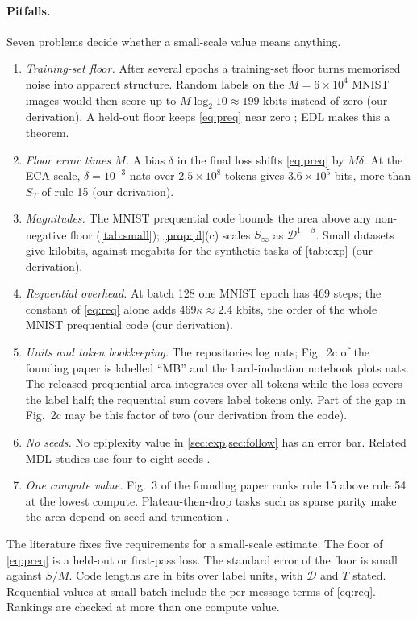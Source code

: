 \documentclass[11pt]{article}
\newcommand{\Dt}{\mathcal{D}}\newcommand{\PT}{\mathcal{P}_T}\newcommand{\prog}{\mathrm{P}}
\theoremstyle{tight}
\begin{document}
\paragraph{Pitfalls.} Seven problems decide whether a small-scale value means anything.
\begin{enumerate}
\item \emph{Training-set floor.} After several epochs a training-set floor turns memorised noise into
apparent structure. Random labels on the $M=6\times10^4$ MNIST images would then score up to
$M\log_2 10\approx199$ kbits instead of zero (our derivation). A held-out floor keeps \eqref{eq:preq}
near zero \citep{zhang2020transfer}; EDL makes this a theorem.
\item \emph{Floor error times $M$.} A bias $\delta$ in the final loss shifts \eqref{eq:preq} by
$M\delta$. At the ECA scale, $\delta=10^{-3}$ nats over $2.5\times10^8$ tokens gives $3.6\times10^5$
bits, more than $S_T$ of rule 15 (our derivation).
\item \emph{Magnitudes.} The MNIST prequential code bounds the area above any non-negative floor
(\cref{tab:small}); \cref{prop:pl}(c) scales $S_\infty$ as $\Dt^{1-\beta}$. Small datasets give
kilobits, against megabits for the synthetic tasks of \cref{tab:exp} (our derivation).
\item \emph{Requential overhead.} At batch 128 one MNIST epoch has 469 steps; the constant of
\eqref{eq:req} alone adds $469\kappa\approx2.4$ kbits, the order of the whole MNIST prequential code
(our derivation).
\item \emph{Units and token bookkeeping.} The repositories log nats; Fig.~2c of the founding paper is
labelled ``MB'' and the hard-induction notebook plots nats. The released prequential area integrates
over all tokens while the loss covers the label half; the requential sum covers label tokens only.
Part of the gap in Fig.~2c may be this factor of two (our derivation from the code).
\item \emph{No seeds.} No epiplexity value in \cref{sec:exp,sec:follow} has an error bar. Related MDL
studies use four to eight seeds \citep{voita2020,perez2021,whitney2020}.
\item \emph{One compute value.} Fig.~3 of the founding paper ranks rule 15 above rule 54 at the lowest
compute. Plateau-then-drop tasks such as sparse parity make the area depend on seed and truncation
\citep{barak2022parity}.
\end{enumerate}

\begin{stated}
The literature fixes five requirements for a small-scale estimate. The floor of \eqref{eq:preq} is a
held-out or first-pass loss. The standard error of the floor is small against $S/M$. Code lengths are
in bits over label units, with $\Dt$ and $T$ stated. Requential values at small batch include the
per-message terms of \eqref{eq:req}. Rankings are checked at more than one compute value.
\end{stated}
\end{document}
